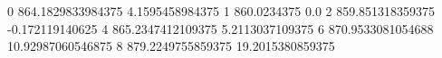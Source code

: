 0 864.1829833984375 4.1595458984375
1 860.0234375 0.0
2 859.851318359375 -0.172119140625
4 865.2347412109375 5.2113037109375
6 870.9533081054688 10.92987060546875
8 879.2249755859375 19.2015380859375
